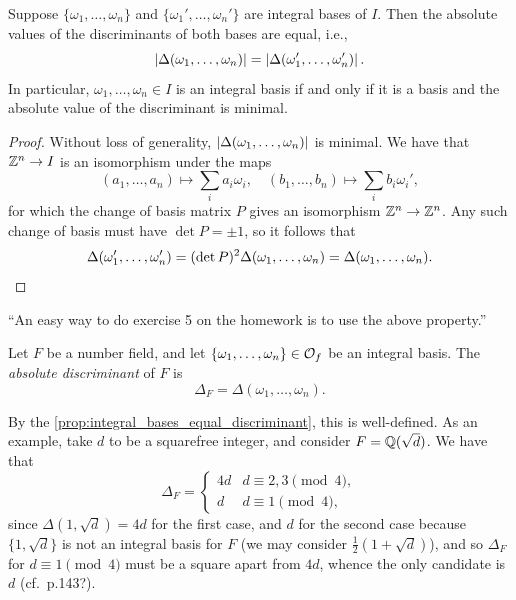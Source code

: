 \newpage
\begin{proposition} \label{prop:integral_bases_equal_discriminant}
    Suppose $\{\omega_1, \dots, \omega_n\}$ and $\{\omega_1', \dots, \omega_n'\}$ are integral bases of $I$. Then the absolute values of the discriminants of both bases are equal, i.e.,
    \[ \left\lvert \Delta(\omega_1, \dots, \omega_n) \right\rvert = \left\lvert \Delta(\omega_1', \dots, \omega_n') \right\rvert. \]
    In particular, $\omega_1, \dots, \omega_n \in I$ is an integral basis if and only if it is a basis and the absolute value of the discriminant is minimal.
\end{proposition}
\begin{proof}
    Without loss of generality, $\left\lvert \Delta(\omega_1, \dots, \omega_n) \right\rvert$ is minimal. We have that $\mathbb Z^n \to I$ is an isomorphism under the maps
    \[ (a_1, \dots, a_n) \mapsto \sum_i a_i \omega_i, \quad (b_1, \dots, b_n) \mapsto \sum_i b_i \omega_i', \]
    for which the change of basis matrix $P$ gives an isomorphism $\mathbb Z^n \to \mathbb Z^n$. Any such change of basis must have $\det P = \pm 1$, so it follows that
    \[ \Delta(\omega_1', \dots, \omega_n') = (\det P)^2 \Delta(\omega_1, \dots, \omega_n) = \Delta(\omega_1, \dots, \omega_n). \qedhere \]
\end{proof} \vspace{-8pt}
{\color{airforceblue} ``An easy way to do exercise 5 on the homework is to use the above property.''}

\begin{definition} \label{defn:absolute_discriminant}
    Let $F$ be a number field, and let $\{\omega_1, \dots, \omega_n\} \in \mathcal O_f$ be an integral basis. The \textit{absolute discriminant} of $F$ is
    \[ \Delta_F = \Delta(\omega_1, \dots, \omega_n). \]
\end{definition} \vspace{-8pt}
By the \ref{prop:integral_bases_equal_discriminant}, this is well-defined. As an example, take $d$ to be a squarefree integer, and consider $F = \mathbb Q(\sqrt{d})$. We have that
\[ \Delta_F = \begin{cases} 4d & d \equiv 2,3 \pmod{4}, \\ d & d \equiv 1 \pmod{4}, \end{cases} \]
since $\Delta(1, \sqrt{d}) = 4d$ for the first case, and $d$ for the second case because $\{1, \sqrt{d}\}$ is not an integral basis for $F$ (we may consider $\frac{1}{2}(1 + \sqrt{d})$), and so $\Delta_F$ for $d \equiv 1 \pmod{4}$ must be a square apart from $4d$, whence the only candidate is $d$ (cf.\ p.143?).

